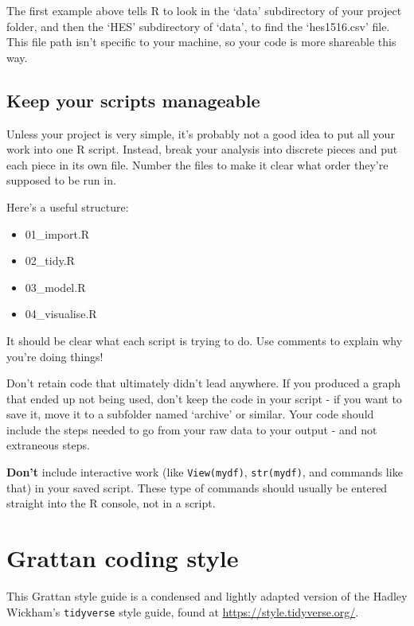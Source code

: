 \documentclass[]{book}
\providecommand{\tightlist}{%
  \setlength{\itemsep}{0pt}\setlength{\parskip}{0pt}}
\begin{document}
The first example above tells R to look in the `data' subdirectory of your project folder, and then the `HES' subdirectory of `data', to find the `hes1516.csv' file. This file path isn't specific to your machine, so your code is more shareable this way.

\hypertarget{manageable}{%
\section{Keep your scripts manageable}\label{manageable}}

Unless your project is very simple, it's probably not a good idea to put all your work into one R script. Instead, break your analysis into discrete pieces and put each piece in its own file. Number the files to make it clear what order they're supposed to be run in.

Here's a useful structure:

\begin{itemize}
\tightlist
\item
  01\_import.R
\item
  02\_tidy.R
\item
  03\_model.R
\item
  04\_visualise.R
\end{itemize}

It should be clear what each script is trying to do. Use comments to explain why you're doing things!

Don't retain code that ultimately didn't lead anywhere. If you produced a graph that ended up not being used, don't keep the code in your script - if you want to save it, move it to a subfolder named `archive' or similar. Your code should include the steps needed to go from your raw data to your output - and not extraneous steps.

\textbf{Don't} include interactive work (like \texttt{View(mydf)}, \texttt{str(mydf)}, and commands like that) in your saved script. These type of commands should usually be entered straight into the R console, not in a script.

\hypertarget{grattan-coding-style}{%
\chapter{Grattan coding style}\label{grattan-coding-style}}

This Grattan style guide is a condensed and lightly adapted version of the Hadley Wickham's \texttt{tidyverse} style guide, found at \url{https://style.tidyverse.org/}.
\end{document}
